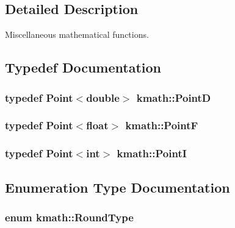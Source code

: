 \subsection{Detailed Description}
Miscellaneous mathematical functions. 

\subsection{Typedef Documentation}
\hypertarget{namespacekmath_aad2e627ee7da1b98c2c516f20ed5b7e3}{
\subsubsection[{Point\-D}]{\setlength{\rightskip}{0pt plus 5cm}typedef {\bf Point}$<$double$>$ {\bf kmath\-::\-Point\-D}}}\label{namespacekmath_aad2e627ee7da1b98c2c516f20ed5b7e3}
\hypertarget{namespacekmath_ad80aa80b21a1aeadbd484a0fc56f4e95}{
\subsubsection[{Point\-F}]{\setlength{\rightskip}{0pt plus 5cm}typedef {\bf Point}$<$float$>$ {\bf kmath\-::\-Point\-F}}}\label{namespacekmath_ad80aa80b21a1aeadbd484a0fc56f4e95}
\hypertarget{namespacekmath_afaf3fde3b20c9932e144eb48e736cad9}{
\subsubsection[{Point\-I}]{\setlength{\rightskip}{0pt plus 5cm}typedef {\bf Point}$<$int$>$ {\bf kmath\-::\-Point\-I}}}\label{namespacekmath_afaf3fde3b20c9932e144eb48e736cad9}


\subsection{Enumeration Type Documentation}
\hypertarget{namespacekmath_a1e00ae34fe8ed9548870fc759ea82609}{
\subsubsection[{Round\-Type}]{\setlength{\rightskip}{0pt plus 5cm}enum {\bf kmath\-::\-Round\-Type}}}\label{namespacekmath_a1e00ae34fe8ed9548870fc759ea82609}


